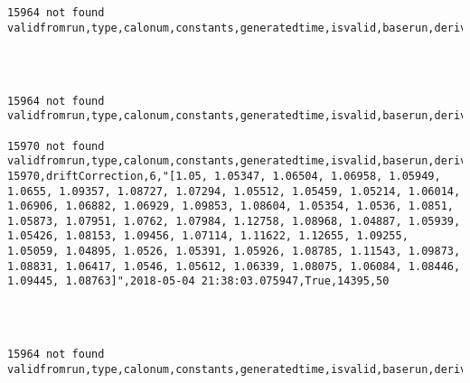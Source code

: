 \documentclass[8pt]{article}
\begin{document}
    \begin{Verbatim}[commandchars=\\\{\}]
15964 not found validfromrun,type,calonum,constants,generatedtime,isvalid,baserun,derivedsubrun


    \end{Verbatim}

    \begin{center}
    \end{center}
    { \hspace*{\fill} \\}
    
    \begin{Verbatim}[commandchars=\\\{\}]
15964 not found validfromrun,type,calonum,constants,generatedtime,isvalid,baserun,derivedsubrun

15970 not found validfromrun,type,calonum,constants,generatedtime,isvalid,baserun,derivedsubrun
15970,driftCorrection,6,"[1.05, 1.05347, 1.06504, 1.06958, 1.05949, 1.0655, 1.09357, 1.08727, 1.07294, 1.05512, 1.05459, 1.05214, 1.06014, 1.06906, 1.06882, 1.06929, 1.09853, 1.08604, 1.05354, 1.0536, 1.0851, 1.05873, 1.07951, 1.0762, 1.07984, 1.12758, 1.08968, 1.04887, 1.05939, 1.05426, 1.08153, 1.09456, 1.07114, 1.11622, 1.12655, 1.09255, 1.05059, 1.04895, 1.0526, 1.05391, 1.05926, 1.08785, 1.11543, 1.09873, 1.08831, 1.06417, 1.0546, 1.05612, 1.06339, 1.08075, 1.06084, 1.08446, 1.09445, 1.08763]",2018-05-04 21:38:03.075947,True,14395,50


    \end{Verbatim}

    \begin{center}
    \end{center}
    { \hspace*{\fill} \\}
    
    \begin{Verbatim}[commandchars=\\\{\}]
15964 not found validfromrun,type,calonum,constants,generatedtime,isvalid,baserun,derivedsubrun


    \end{Verbatim}

    \begin{center}
    \end{center}
    { \hspace*{\fill} \\}
    
\end{document}
